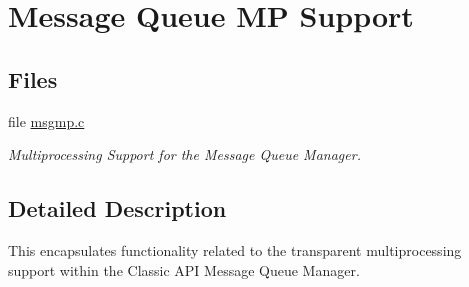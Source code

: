 \hypertarget{group__ClassicMsgMP}{}\section{Message Queue MP Support}
\label{group__ClassicMsgMP}
\subsection*{Files}
\begin{DoxyCompactItemize}
\item 
file \mbox{\hyperlink{msgmp_8c}{msgmp.\+c}}
\begin{DoxyCompactList}\small\item\em Multiprocessing Support for the Message Queue Manager. \end{DoxyCompactList}\end{DoxyCompactItemize}


\subsection{Detailed Description}
This encapsulates functionality related to the transparent multiprocessing support within the Classic A\+PI Message Queue Manager. 